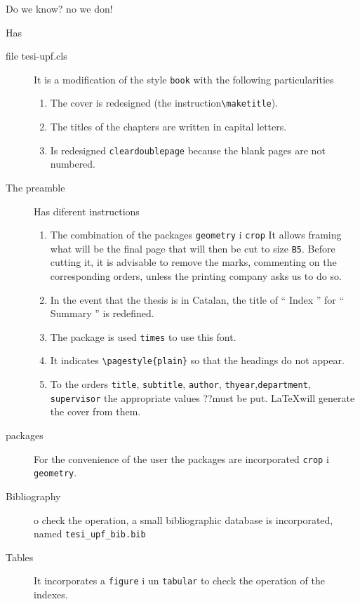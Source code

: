 \documentclass[12pt, b5paper,twoside]{tesi_upf}
\begin{document}
Do we know? no we don!

Has
\begin{description}
\item[file tesi-upf.cls] It is a modification of the style {\tt book} with the following particularities
  \begin{enumerate}
  \item The cover is redesigned (the instruction\verb+\maketitle+).

  \item The titles of the chapters are written in capital letters.

  \item Is redesigned {\tt cleardoublepage} because the blank pages are not numbered.
  \end{enumerate}

\item[The preamble] Has diferent instructions
  \begin{enumerate}
  \item The combination of the packages {\tt geometry} i {\tt crop} It allows framing what will be the final page that will then be cut to size {\tt B5}. Before cutting it, it is advisable to remove the marks, commenting on the corresponding orders, unless the printing company asks us to do so.

  \item In the event that the thesis is in Catalan, the title of `` Index '' for `` Summary '' is redefined.

  \item The package is used {\tt times} to use this font.

  \item It indicates \verb+\pagestyle{plain}+ so that the headings do not appear.

  \item  To the orders {\tt title}, {\tt subtitle}, {\tt author}, {\tt thyear},{\tt department}, {\tt supervisor} the appropriate values ??must be put. \LaTeX will generate the cover from them.
  \end{enumerate}

\item[packages] For the convenience of the user the packages are incorporated {\tt crop} i {\tt geometry}. 

\item[Bibliography] o check the operation, a small bibliographic database is incorporated, named  \verb+tesi_upf_bib.bib+


\item[Tables] It incorporates a \verb+figure+ i un \verb+tabular+ to check the operation of the indexes.

\end{description}
\end{document}
